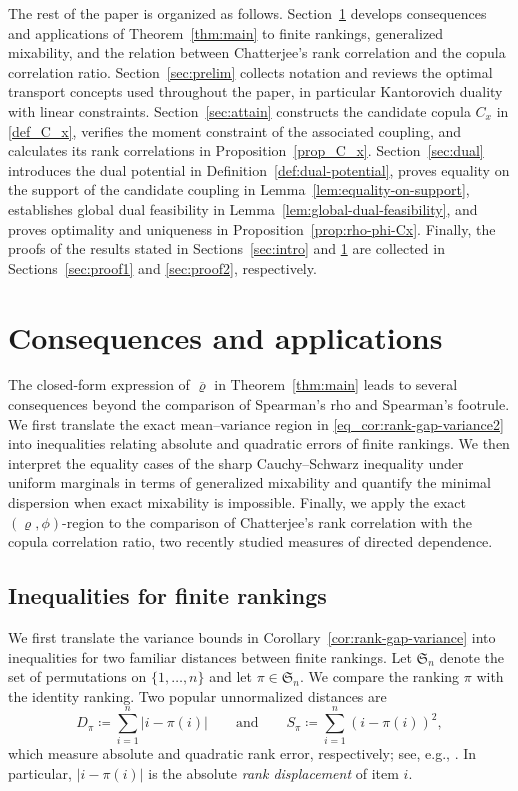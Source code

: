 \documentclass{article}
\newcommand{\brho}{\overline\varrho}
\begin{document}
The rest of the paper is organized as follows.
Section~\ref{sec:appl_main_thm} develops consequences and applications of
Theorem~\ref{thm:main} to finite rankings, generalized mixability, and the
relation between Chatterjee's rank correlation and the copula correlation ratio.
Section~\ref{sec:prelim} collects notation and reviews the optimal transport
concepts used throughout the paper, in particular Kantorovich duality with
linear constraints.
Section~\ref{sec:attain} constructs the candidate copula \(C_x\) in
\eqref{def_C_x}, verifies the moment constraint of the associated coupling,
and calculates its rank correlations in Proposition~\ref{prop_C_x}.
Section~\ref{sec:dual} introduces the dual potential in
Definition~\ref{def:dual-potential}, proves equality on the support of the
candidate coupling in Lemma~\ref{lem:equality-on-support}, establishes global
dual feasibility in Lemma~\ref{lem:global-dual-feasibility}, and proves
optimality and uniqueness in Proposition~\ref{prop:rho-phi-Cx}.
Finally, the proofs of the results stated in Sections~\ref{sec:intro} and
\ref{sec:appl_main_thm} are collected in Sections~\ref{sec:proof1} and
\ref{sec:proof2}, respectively.

\section{Consequences and applications}\label{sec:appl_main_thm}

The closed-form expression of \(\brho\) in Theorem~\ref{thm:main} leads to several consequences beyond the comparison of Spearman's rho and Spearman's footrule.
We first translate the exact mean--variance region in \eqref{eq_cor:rank-gap-variance2} into inequalities relating absolute and quadratic errors of finite rankings.
We then interpret the equality cases of the sharp Cauchy--Schwarz inequality under uniform marginals in terms of generalized mixability and quantify the minimal dispersion when exact mixability is impossible.
Finally, we apply the exact \((\varrho,\phi)\)-region to the comparison of Chatterjee's rank correlation with the copula correlation ratio, two recently studied measures of directed dependence.

\subsection{Inequalities for finite rankings}\label{sec_21}

We first translate the variance bounds in Corollary~\ref{cor:rank-gap-variance} into inequalities for two familiar distances between finite rankings.
Let \(\mathfrak S_n\) denote the set of permutations on \(\{1,\ldots,n\}\) and let \(\pi\in\mathfrak S_n\).
We compare the ranking \(\pi\) with the identity ranking.
Two popular unnormalized distances are
\begin{equation}\label{eq:finite-rank-distances}
    D_\pi\coloneqq\sum_{i=1}^n|i-\pi(i)|
    \qquad\text{and}\qquad
    S_\pi\coloneqq\sum_{i=1}^n(i-\pi(i))^2,
\end{equation}
which measure absolute and quadratic rank error, respectively; see, e.g., \cite{clemencon2013ranking,diaconis1977spearman}.
In particular, \(|i-\pi(i)|\) is the absolute \emph{rank displacement} of item \(i\).
\end{document}
